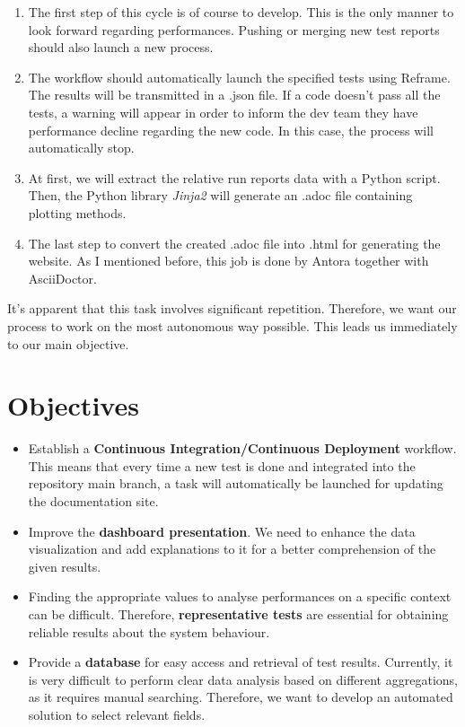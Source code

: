 \documentclass[12pt]{article}
\begin{document}
\newpage
\begin{enumerate}
    \item The first step of this cycle is of course to develop. This is the only manner to look forward regarding performances.
    Pushing or merging new test reports should also launch a new process.
    \item The workflow should automatically launch the specified tests using Reframe. The results will be transmitted in a .json file.
    If a code doesn't pass all the tests, a warning will appear in order to inform the dev team they have performance decline regarding the new code. In this case, the process will automatically stop.
    \item At first, we will extract the relative run reports data with a Python script. Then, the Python library \textit{Jinja2}\cite*{Jinja2} will generate an .adoc file containing plotting methods.
    \item The last step to convert the created .adoc file into .html for generating the website. As I mentioned before, this job is done by Antora together with AsciiDoctor.
\end{enumerate}

It's apparent that this task involves significant repetition. Therefore, we want our process to work on the most autonomous way possible. This leads us immediately to our main objective.



\section{Objectives}
\begin{itemize}
    \item Establish a \textbf{Continuous Integration/Continuous Deployment} workflow.
    This means that every time a new test is done and integrated into the repository main branch, a task will automatically be launched for updating the documentation site.
    \item Improve the \textbf{dashboard presentation}. We need to enhance the data visualization and add explanations to it for a better comprehension of the given results.
    \item Finding the appropriate values to analyse performances on a specific context can be difficult. Therefore, \textbf{representative tests} are essential for obtaining reliable results about the system behaviour.
    \item Provide a \textbf{database} for easy access and retrieval of test results.
    Currently, it is very difficult to perform clear data analysis based on different aggregations, as it requires manual searching.
    Therefore, we want to develop an automated solution to select relevant fields.

\end{itemize}
\end{document}
